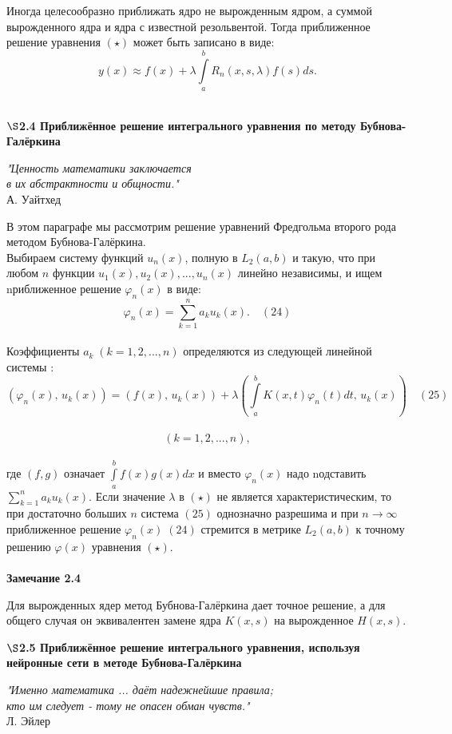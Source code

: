 \documentclass[12pt]{article}
\begin{document}
Иногда целесообразно приближать ядро не вырожденным ядром, а суммой вырожденного ядра и ядра с известной резольвентой. Тогда приближенное решение уравнения $ (\star) $ может быть записано в виде:\\
$$ y(x) \approx f(x) + \lambda\int\limits_a^b R_n(x,s,\lambda)f(s) ds. $$ \\
\newpage
\begin{center}
	\textbf{$ \S $2.4 Приближённое решение интегрального уравнения по методу Бубнова-Галёркина }
\end{center}
\begin{flushright}
	\textit{"Ценность математики заключается\\
		в их абстрактности и общности."}\\
	А. Уайтхед
\end{flushright}

В этом параграфе мы рассмотрим решение уравнений Фредгольма второго рода методом Бубнова-Галёркина. \\

Выбираем систему функций $ {u_n(x)} $, полную в $ L_2(a,b) $ и такую, что при любом $ n $ функции $ u_1(x), u_2(x), ..., u_n(x) $ линейно независимы, и ищем nриближенное решение $ \varphi_n(x) $ в виде:\\
$$ \varphi_n(x) = \sum\limits_{k=1}^n a_ku_k(x) . \quad (24) $$\\

Коэффициенты $ a_k \; (k = 1,2 , ..., n ) $ определяются из следующей линейной системы :\\
$$ (\varphi_n(x),\, u_k(x)) = (f(x), \, u_k(x)) + \lambda\left( \int\limits_a^b K(x,t)\varphi_n(t)dt, \, u_k(x) \right) \quad (25)$$\\
$$ (k = 1, 2, ..., n), $$\\
где $ (f,g) $ означает $ \int\limits_a^b f(x)g(x)dx $ и вместо $ \varphi_n(x) $ надо nодставить $ \sum\limits_{k=1}^n a_ku_k(x) $. Если значение $ \lambda $ в $ (\star) $ не является характеристическим, то при достаточно больших  $ n $ система $ (25) $ однозначно разрешима и при $ n \rightarrow \infty $ приближенное решение $ \varphi_n(x) \; (24) $ стремится в метрике $ L_2(a,b) $ к точному решению $ \varphi(x) $ уравнения $ (\star) $. \\
\\
\textbf{Замечание 2.4} 

Для вырожденных ядер метод Бубнова-Галёркина дает точное решение, а для общего случая он эквивалентен замене ядра $ K(x,s) $ на вырожденное $ H(x,s) $.\\
\newpage
\begin{center}
	\textbf{$ \S $2.5 Приближённое решение интегрального уравнения, используя нейронные сети в методе Бубнова-Галёркина }
\end{center}
\begin{flushright}
	\textit{"Именно математика ... даёт надежнейшие правила;\\
		кто им следует - тому не опасен обман чувств."}\\
	Л. Эйлер
\end{flushright}
\end{document}
